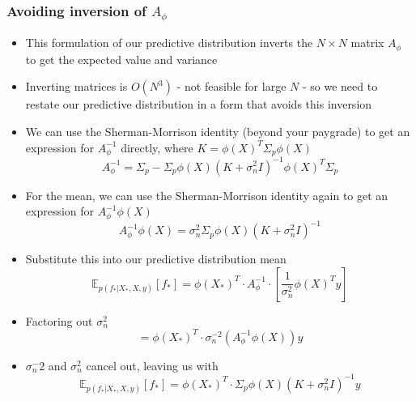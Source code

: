 \documentclass[12pt]{article}
\begin{document}
\subsubsection{Avoiding inversion of $A_{\phi}$}
\begin{itemize}
    \item This formulation of our predictive distribution inverts the $N \times N$ matrix $A_{\phi}$ to get the expected value and variance
    \item Inverting matrices is $O(N^3)$ - not feasible for large $N$ - so we need to restate our predictive distribution in a form that avoids this inversion
    \item We can use the Sherman-Morrison identity (beyond your paygrade) to get an expression for $A_{\phi}^{-1}$ directly, where $K =\phi(X)^T\Sigma_p\phi(X)$
\begin{equation}
    A_{\phi}^{-1} = \Sigma_p - \Sigma_p\phi(X)(K+\sigma_n^2I)^{-1}\phi(X)^T\Sigma_p
\end{equation}
    \item For the mean, we can use the Sherman-Morrison identity again to get an expression for $A_{\phi}^{-1}\phi(X)$
\begin{equation}
    A_{\phi}^{-1}\phi(X) = \sigma_n^2\Sigma_p\phi(X)(K+\sigma_n^2I)^{-1}
\end{equation}
    \item Substitute this into our predictive distribution mean
\begin{equation}
    \mathbb{E}_{p(f_*|X_*,X,y)}[f_*] = \phi(X_*)^T \cdot A_\phi^{-1} \cdot \left[\frac{1}{\sigma_n^2}\phi(X)^Ty\right]
\end{equation}
    \item Factoring out $\sigma_n^2$
\begin{equation}
    = \phi(X_*)^T \cdot \sigma_n^{-2}(A_\phi^{-1}\phi(X))y
\end{equation}
    \item $\sigma_n^-2$ and $\sigma_n^2$ cancel out, leaving us with
\begin{equation}
    \mathbb{E}_{p(f_*|X_*,X,y)}[f_*] = \phi(X_*)^T \cdot \Sigma_p\phi(X)(K+\sigma_n^2I)^{-1}y
\end{equation}

\end{itemize}
\end{document}
